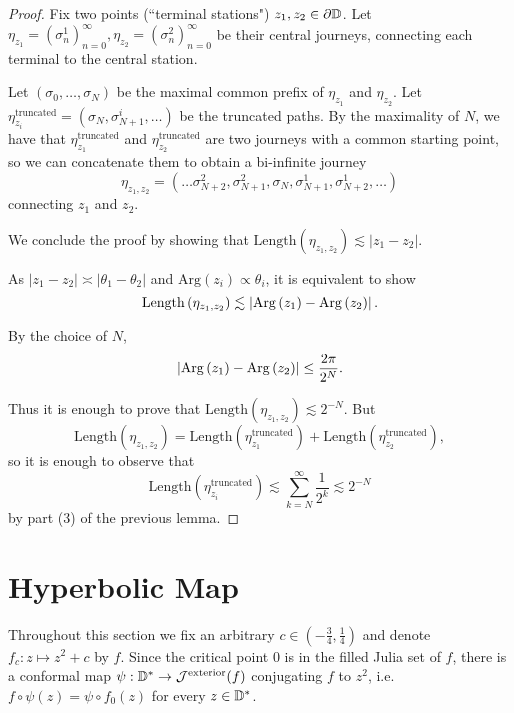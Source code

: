 \begin{proof}
Fix two points (“terminal stations") $z_{1},z_{2}\in\partial\mathbb{D}$.
Let $\eta_{z_{1}}=\left(\sigma_{n}^{1}\right)_{n=0}^{\infty},\eta_{z_{2}}=\left(\sigma_{n}^{2}\right)_{n=0}^{\infty}$
be their central journeys, connecting each terminal to the central
station.

Let $\left(\sigma_{0},\ldots,\sigma_{N}\right)$ be the maximal common
prefix of $\eta_{z_{1}}$ and $\eta_{z_{2}}$. Let $\eta_{z_{i}}^{\text{truncated}}=\left(\sigma_{N},\sigma_{N+1}^{i},\ldots\right)$
be the truncated paths. By the maximality of $N$, we have that $\eta_{z_{1}}^{\text{truncated}}$
and $\eta_{z_{2}}^{\text{truncated}}$ are two journeys with a common
starting point, so we can concatenate them to obtain a bi-infinite
journey 
\[
\eta_{z_{1},z_{2}}=\left(\ldots\sigma_{N+2}^{2},\sigma_{N+1}^{2},\sigma_{N},\sigma_{N+1}^{1},\sigma_{N+2}^{1},\ldots\right)
\]
 connecting $z_{1}$ and $z_{2}$.


We conclude the proof by showing that $\mathrm{Length}\left(\eta_{z_{1},z_{2}}\right)\lesssim\left|z_{1}-z_{2}\right|$.

As $\left|z_{1}-z_{2}\right|\asymp\left|\theta_{1}-\theta_{2}\right|$
and $\mathrm{Arg}\left(z_{i}\right)\propto\theta_{i}$, it is equivalent
to show
\[
\mathrm{Length}\left(\eta_{z_{1},z_{2}}\right)\lesssim\left|\mathrm{Arg}\left(z_{1}\right)-\mathrm{Arg}\left(z_{2}\right)\right|.
\]

By the choice of $N$, 
\[
\left|\mathrm{Arg}\left(z_{1}\right)-\mathrm{Arg}\left(z_{2}\right)\right|\leq\frac{2\pi}{2^{N}}.
\]

Thus it is enough to prove that $\mathrm{Length}\left(\eta_{z_{1},z_{2}}\right)\lesssim2^{-N}$.
But 
\[
\mathrm{Length}\left(\eta_{z_{1},z_{2}}\right)=\mathrm{Length}\left(\eta_{z_{1}}^{\text{truncated}}\right)+\mathrm{Length}\left(\eta_{z_{2}}^{\text{truncated}}\right),
\]
so it is enough to observe that 
\[
\mathrm{Length}\left(\eta_{z_{i}}^{\text{truncated}}\right)\lesssim\sum_{k=N}^{\infty}\frac{1}{2^{k}}\lesssim2^{-N}
\]
by part (3) of the previous lemma.

\end{proof}

\section{Hyperbolic Map}

Throughout this section we fix an arbitrary $c\in\left(-\frac{3}{4},\frac{1}{4}\right)$ and denote $f_c: z\mapsto z^2 + c$ by $f$.
Since the critical point $0$ is in the filled Julia set of $f$,
there is a conformal map $\psi:\mathbb{D}^{*}\to\mathcal{J}^{\text{exterior}}(f)$
conjugating $f$ to $z^{2}$, i.e. $f\circ\psi(z)=\psi\circ f_{0}(z)$
for every $z\in\mathbb{D}^{*}$.

